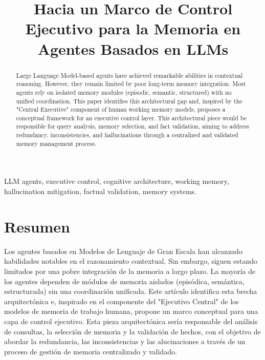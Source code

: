 \documentclass[journal,onecolumn]{IEEEtran}
\title{Hacia un Marco de Control Ejecutivo para la Memoria en Agentes Basados en LLMs}
\author{
    \IEEEauthorblockN{Sebastian Eduardo Francisco Puentes Prieto}
    \IEEEauthorblockA{
        Magíster en Ingeniería Informática\\
        Universidad de La Frontera\\
        Email: spuentes.01@ufromail.cl}
}
\begin{document}
\maketitle


\begin{abstract}
Large Language Model-based agents have achieved remarkable abilities in contextual reasoning. However, they remain limited by poor long-term memory integration. Most agents rely on isolated memory modules (episodic, semantic, structured) with no unified coordination. This paper identifies this architectural gap and, inspired by the "Central Executive" component of human working memory models, proposes a conceptual framework for an executive control layer. This architectural piece would be responsible for query analysis, memory selection, and fact validation, aiming to address redundancy, inconsistencies, and hallucinations through a centralized and validated memory management process.
\end{abstract}

\begin{IEEEkeywords}
LLM agents, executive control, cognitive architecture, working memory, hallucination mitigation, factual validation, memory systems.
\end{IEEEkeywords}

\section*{Resumen}
Los agentes basados en Modelos de Lenguaje de Gran Escala han alcanzado habilidades notables en el razonamiento contextual. Sin embargo, siguen estando limitados por una pobre integración de la memoria a largo plazo. La mayoría de los agentes dependen de módulos de memoria aislados (episódica, semántica, estructurada) sin una coordinación unificada. Este artículo identifica esta brecha arquitectónica e, inspirado en el componente del "Ejecutivo Central" de los modelos de memoria de trabajo humana, propone un marco conceptual para una capa de control ejecutivo. Esta pieza arquitectónica sería responsable del análisis de consultas, la selección de memoria y la validación de hechos, con el objetivo de abordar la redundancia, las inconsistencias y las alucinaciones a través de un proceso de gestión de memoria centralizado y validado.
\end{document}
